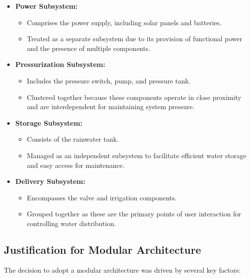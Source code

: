 \documentclass[12pt]{report}
\begin{document}
\begin{itemize}
    \item \textbf{Power Subsystem:}
    \begin{itemize}
        \item Comprises the power supply, including solar panels and batteries.
        \item Treated as a separate subsystem due to its provision of functional power and the presence of multiple components.
    \end{itemize}
    
    \item \textbf{Pressurization Subsystem:}
    \begin{itemize}
        \item Includes the pressure switch, pump, and pressure tank.
        \item Clustered together because these components operate in close proximity and are interdependent for maintaining system pressure.
    \end{itemize}
    
    \item \textbf{Storage Subsystem:}
    \begin{itemize}
        \item Consists of the rainwater tank.
        \item Managed as an independent subsystem to facilitate efficient water storage and easy access for maintenance.
    \end{itemize}
    
    \item \textbf{Delivery Subsystem:}
    \begin{itemize}
        \item Encompasses the valve and irrigation components.
        \item Grouped together as these are the primary points of user interaction for controlling water distribution.
    \end{itemize}
\end{itemize}

\subsection{Justification for Modular Architecture}
\label{subsec:justification_modular}

The decision to adopt a modular architecture was driven by several key factors:
\end{document}
